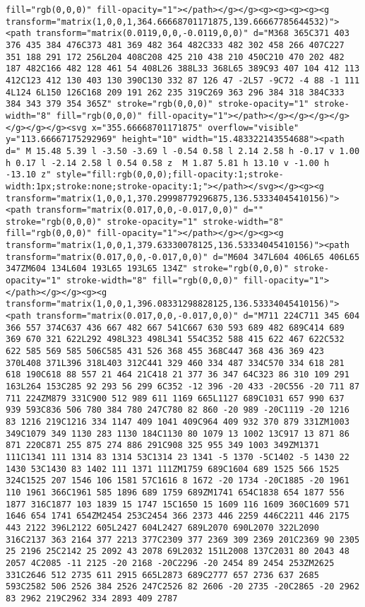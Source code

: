 \documentclass[
]{article}
\begin{document}
\begin{verbatim}
fill="rgb(0,0,0)" fill-opacity="1"></path></g></g><g><g><g><g><g transform="matrix(1,0,0,1,364.66668701171875,139.66667785644532)"><path transform="matrix(0.0119,0,0,-0.0119,0,0)" d="M368 365C371 403 376 435 384 476C373 481 369 482 364 482C333 482 302 458 266 407C227 351 188 291 172 256L204 408C208 425 210 438 210 450C210 470 202 482 187 482C166 482 128 461 54 408L26 388L33 368L65 389C93 407 104 412 113 412C123 412 130 403 130 390C130 332 87 126 47 -2L57 -9C72 -4 88 -1 111 4L124 6L150 126C168 209 191 262 235 319C269 363 296 384 318 384C333 384 343 379 354 365Z" stroke="rgb(0,0,0)" stroke-opacity="1" stroke-width="8" fill="rgb(0,0,0)" fill-opacity="1"></path></g></g></g></g></g></g></g><svg x="355.66668701171875" overflow="visible" y="113.66667175292969" height="10" width="15.483322143554688"><path d=" M 15.48 5.39 l -3.50 -3.69 l -0.54 0.58 l 2.14 2.58 h -0.17 v 1.00 h 0.17 l -2.14 2.58 l 0.54 0.58 z  M 1.87 5.81 h 13.10 v -1.00 h -13.10 z" style="fill:rgb(0,0,0);fill-opacity:1;stroke-width:1px;stroke:none;stroke-opacity:1;"></path></svg></g><g><g transform="matrix(1,0,0,1,370.29998779296875,136.53334045410156)"><path transform="matrix(0.017,0,0,-0.017,0,0)" d="" stroke="rgb(0,0,0)" stroke-opacity="1" stroke-width="8" fill="rgb(0,0,0)" fill-opacity="1"></path></g></g><g><g transform="matrix(1,0,0,1,379.63330078125,136.53334045410156)"><path transform="matrix(0.017,0,0,-0.017,0,0)" d="M604 347L604 406L65 406L65 347ZM604 134L604 193L65 193L65 134Z" stroke="rgb(0,0,0)" stroke-opacity="1" stroke-width="8" fill="rgb(0,0,0)" fill-opacity="1"></path></g></g><g><g transform="matrix(1,0,0,1,396.08331298828125,136.53334045410156)"><path transform="matrix(0.017,0,0,-0.017,0,0)" d="M711 224C711 345 604 366 557 374C637 436 667 482 667 541C667 630 593 689 482 689C414 689 369 670 321 622L292 498L323 498L341 554C352 588 415 622 467 622C532 622 585 569 585 506C585 431 526 368 455 368C447 368 436 369 423 370L408 371L396 318L403 312C441 329 460 334 487 334C570 334 618 281 618 190C618 88 557 21 464 21C418 21 377 36 347 64C323 86 310 109 291 163L264 153C285 92 293 56 299 6C352 -12 396 -20 433 -20C556 -20 711 87 711 224ZM879 331C900 512 989 611 1169 665L1127 689C1031 657 990 637 939 593C836 506 780 384 780 247C780 82 860 -20 989 -20C1119 -20 1216 83 1216 219C1216 334 1147 409 1041 409C964 409 932 370 879 331ZM1003 349C1079 349 1130 283 1130 184C1130 80 1079 13 1002 13C917 13 871 86 871 220C871 255 875 274 886 291C908 325 955 349 1003 349ZM1371 111C1341 111 1314 83 1314 53C1314 23 1341 -5 1370 -5C1402 -5 1430 22 1430 53C1430 83 1402 111 1371 111ZM1759 689C1604 689 1525 566 1525 324C1525 207 1546 106 1581 57C1616 8 1672 -20 1734 -20C1885 -20 1961 110 1961 366C1961 585 1896 689 1759 689ZM1741 654C1838 654 1877 556 1877 316C1877 103 1839 15 1747 15C1650 15 1609 116 1609 360C1609 571 1646 654 1741 654ZM2454 253C2454 366 2373 446 2259 446C2211 446 2175 443 2122 396L2122 605L2427 604L2427 689L2070 690L2070 322L2090 316C2137 363 2164 377 2213 377C2309 377 2369 309 2369 201C2369 90 2305 25 2196 25C2142 25 2092 43 2078 69L2032 151L2008 137C2031 80 2043 48 2057 4C2085 -11 2125 -20 2168 -20C2296 -20 2454 89 2454 253ZM2625 331C2646 512 2735 611 2915 665L2873 689C2777 657 2736 637 2685 593C2582 506 2526 384 2526 247C2526 82 2606 -20 2735 -20C2865 -20 2962 83 2962 219C2962 334 2893 409 2787 
\end{verbatim}
\end{document}
